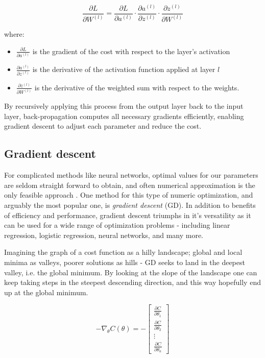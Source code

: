 \begin{equation}
\frac{\partial L}{\partial W^{(l)}} = \frac{\partial L}{\partial a^{(l)}} \cdot \frac{\partial a^{(l)}}{\partial z^{(l)}} \cdot \frac{\partial z^{(l)}}{\partial W^{(l)}}
\end{equation}

where:
\begin{itemize}[label=--]
    \item $\frac{\partial L}{\partial a^{(l)}}$ is the gradient of the cost with respect to the layer’s activation
    \item $\frac{\partial a^{(l)}}{\partial z^{(l)}}$ is the derivative of the activation function applied at layer $l$
    \item $\frac{\partial z^{(l)}}{\partial W^{(l)}}$ is the derivative of the weighted sum with respect to the weights.
\end{itemize}

By recursively applying this process from the output layer back to the input layer, back-propagation computes all necessary gradients efficiently, enabling gradient descent to adjust each parameter and reduce the cost.

\subsection{Gradient descent } \label{sec:gd}
For complicated methods like neural networks, optimal values for our parameters are seldom straight forward to obtain, and often numerical approximation is the only feasible approach \citep[Week 40]{morten}.  
One method for this type of numeric optimization, and arguably the most popular one, is \textit{gradient descent} (GD). In addition to benefits of efficiency and performance, gradient descent triumphs in it's versatility as it can be used for a wide range of optimization problems - including linear regression, logistic regression, neural networks, and many more. 

Imagining the graph of a cost function as a hilly landscape; global and local minima as valleys, poorer solutions as hills - GD seeks to land in the deepest valley, i.e. the global minimum. 
By looking at the slope of the landscape one can keep taking steps in the steepest descending direction, and this way hopefully end up at the global minimum.

\begin{equation}\label{eq:gd}
    -\nabla_\theta C(\theta) = -\begin{bmatrix}
\frac{\partial C}{\partial \theta_1} \\
\frac{\partial C}{\partial \theta_2} \\
\vdots \\
\frac{\partial C}{\partial \theta_n}
\end{bmatrix}
\end{equation}

